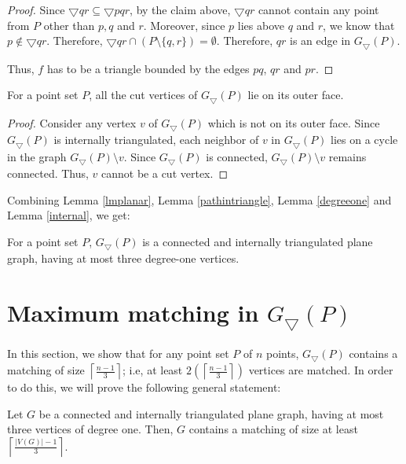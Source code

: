 \begin{proof}
Since $\bigtriangledown qr \subseteq \bigtriangledown pqr$, by the claim above, $\bigtriangledown qr$ cannot contain any point from $P$ other than $p, q$ 
and $r$. Moreover, since $p$ lies above $q$ and $r$, we know that $p \notin \bigtriangledown qr$. 
Therefore, $\bigtriangledown qr \cap (P \setminus \{q, r\}) = \emptyset$. Therefore, $qr$ is an edge in $G_\bigtriangledown(P)$.

Thus, $f$ has to be a triangle bounded by the edges $pq$, $qr$ and $pr$. 
\end{proof}
\begin{corollary}\label{outercutvertex}
 For a point set $P$, all the cut vertices of $G_\bigtriangledown(P)$ lie on its outer face. 
\end{corollary}
\begin{proof}
 Consider any vertex $v$ of $G_\bigtriangledown(P)$ which is not on its outer face. Since $G_\bigtriangledown(P)$ is internally triangulated, each 
neighbor of $v$ in $G_\bigtriangledown(P)$ lies on a cycle in the graph $G_\bigtriangledown(P) \setminus v$. Since $G_\bigtriangledown(P)$
is connected, $G_\bigtriangledown(P) \setminus v$ remains connected. Thus, $v$ cannot be a cut vertex. 
\end{proof}
Combining Lemma \ref{lmplanar}, Lemma \ref{pathintriangle}, Lemma \ref{degreeone} and Lemma \ref{internal}, we get:
\begin{theorem}\label{propertiesofG}
 For a point set $P$, $G_\bigtriangledown(P)$ is a connected and internally triangulated plane graph, having at most three degree-one vertices.   
\end{theorem}
\section{Maximum matching in $G_\bigtriangledown(P)$}\label{maxmatch}
In this section, we show that for any point set $P$ of $n$ points, $G_\bigtriangledown(P)$ contains a matching of 
size $\left \lceil\frac{n-1}{3}\right \rceil$; i.e, at least $2\left(\left \lceil\frac{n-1}{3}\right\rceil \right)$ vertices are matched. 
In order to do this, we will prove the following general statement:
\begin{lemma}\label{bound}
 Let $G$ be a connected and internally triangulated plane graph, having at most three vertices of degree one. 
Then, $G$ contains a matching of size at least $\left\lceil\frac{|V(G)|-1}{3} \right\rceil$.  
\end{lemma}
